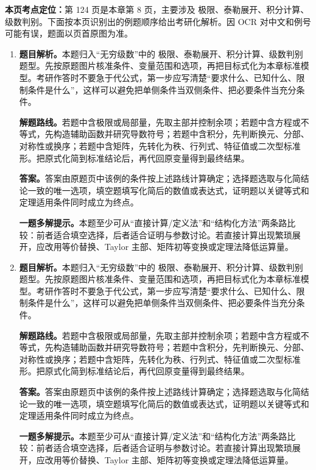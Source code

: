 \begin{solutionblock}
\textbf{本页考点定位：}第 124 页是本章第 8 页，主要涉及 极限、泰勒展开、积分计算、级数判别。下面按本页识别出的例题顺序给出考研化解析。因 OCR 对中文和例号可能有误，题面以页首原图为准。

\begin{enumerate}[label=\textbf{例\arabic*.}, leftmargin=2.4em]

\item \textbf{题目解析。}本题归入“无穷级数”中的 极限、泰勒展开、积分计算、级数判别 题型。先按原题图片核准条件、变量范围和选项，再把目标式化为本章标准模型。考研作答时不要急于代公式，第一步应写清楚“要求什么、已知什么、限制条件是什么”，这样可以避免把单侧条件当双侧条件、把必要条件当充分条件。

\textbf{解题路线。}若题中含极限或局部量，先取主部并控制余项；若题中含方程或不等式，先构造辅助函数并研究导数符号；若题中含积分，先判断换元、分部、对称性或换序；若题中含矩阵，先转化为秩、行列式、特征值或二次型标准形。把原式化简到标准结论后，再代回原变量得到最终结果。

\textbf{答案。}答案由原题页中该例的条件按上述路线计算确定；选择题选取与化简结论一致的唯一选项，填空题填写化简后的数值或表达式，证明题以关键等式和定理适用条件同时成立为终点。

\textbf{一题多解提示。}本题至少可从“直接计算/定义法”和“结构化方法”两条路比较：前者适合填空选择，后者适合证明与参数讨论。若直接计算出现繁琐展开，应改用等价替换、Taylor 主部、矩阵初等变换或定理法降低运算量。

\item \textbf{题目解析。}本题归入“无穷级数”中的 极限、泰勒展开、积分计算、级数判别 题型。先按原题图片核准条件、变量范围和选项，再把目标式化为本章标准模型。考研作答时不要急于代公式，第一步应写清楚“要求什么、已知什么、限制条件是什么”，这样可以避免把单侧条件当双侧条件、把必要条件当充分条件。

\textbf{解题路线。}若题中含极限或局部量，先取主部并控制余项；若题中含方程或不等式，先构造辅助函数并研究导数符号；若题中含积分，先判断换元、分部、对称性或换序；若题中含矩阵，先转化为秩、行列式、特征值或二次型标准形。把原式化简到标准结论后，再代回原变量得到最终结果。

\textbf{答案。}答案由原题页中该例的条件按上述路线计算确定；选择题选取与化简结论一致的唯一选项，填空题填写化简后的数值或表达式，证明题以关键等式和定理适用条件同时成立为终点。

\textbf{一题多解提示。}本题至少可从“直接计算/定义法”和“结构化方法”两条路比较：前者适合填空选择，后者适合证明与参数讨论。若直接计算出现繁琐展开，应改用等价替换、Taylor 主部、矩阵初等变换或定理法降低运算量。

\end{enumerate}
\end{solutionblock}



